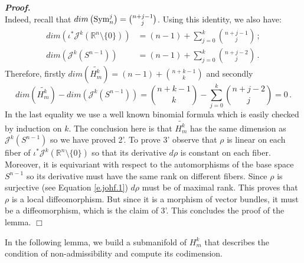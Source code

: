 \documentclass[10pt,twoside]{article}
\newcommand{\calJ}{\mathcal{J}}
\newcommand{\Rnzls}{\mathbb{R}^n\setminus\{0\}}
\newcommand{\Sym}{\textup{Sym}}
\newenvironment{prf}[1][]
{\vskip 2mm  {\it \bf Proof#1. }}{$\Box$ \vskip 2mm}
\numberwithin{theorem}{section}
\begin{document}
\begin{prf}
\[\]
Indeed, recall that $dim\left(\Sym_n^j\right)=\binom{n+j-1}{j}$. Using this identity, we also have:
\begin{align*}
dim\left(\iota^*\calJ^k\left(\Rnzls\right)\right)&=(n-1)+\sum_{j=0}^k\binom{n+j-1}{j}\, ;\\
dim\left(\calJ^k\left(S^{n-1}\right)\right)&=(n-1)+\sum_{j=0}^k\binom{n+j-2}{j}\, .
\end{align*}
Therefore, firstly $dim\left(\widetilde{H^k_m}\right)=(n-1)+\binom{n+k-1}{k}$ and secondly
\begin{equation}\label{e.johf.2}
dim\left(\widetilde{H^k_m}\right)-dim\left(\calJ^k\left(S^{n-1}\right)\right)=\binom{n+k-1}{k}-\sum_{j=0}^{k}\binom{n+j-2}{j}=0\, .
\end{equation}
In the last equality we use a well known binomial formula which is easily checked by induction on $k$. The conclusion here is that $\widetilde{H^k_m}$ has the same dimension as $\calJ^k\left(S^{n-1}\right)$ so we have proved 2'. To prove 3' observe that $\rho$ is linear on each fiber of $\iota^*\calJ^k\left(\Rnzls\right)$ so that its derivative $d\rho$ is constant on each fiber. Moreover, it is equivariant with respect to the automorphisms of the base space $S^{n-1}$ so its derivative must have the same rank on different fibers. Since $\rho$ is surjective (see Equation \eqref{e.johf.1}) $d\rho$ must be of maximal rank. This proves that $\rho$ is a local diffeomorphism. But since it is a morphism of vector bundles, it must be a diffeomorphism, which is the claim of 3'. This concludes the proof of the lemma.
\end{prf}

In the following lemma, we build a submanifold of $H^k_m$ that describes the condition of non-admissibility and compute its codimension.
\end{document}
